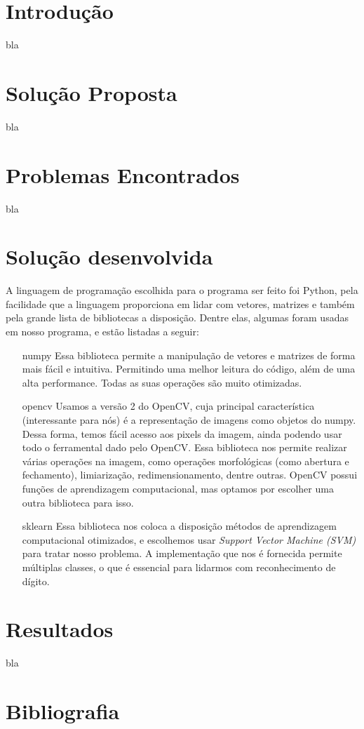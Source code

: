 \documentclass{lista}
\begin{document}
\cabecalho

\section{Introdução}
bla

\section{Solução Proposta}
bla

\section{Problemas Encontrados}
bla

\section{Solução desenvolvida}
A linguagem de programação escolhida para o programa ser feito foi Python,
pela facilidade que a linguagem proporciona em lidar com vetores, matrizes
e também pela grande lista de bibliotecas a disposição. Dentre elas,
algumas foram usadas em nosso programa, e estão listadas a seguir:

\begin{itemize}
	\item[numpy] Essa biblioteca permite a manipulação de vetores e matrizes
		de forma mais fácil e intuitiva. Permitindo uma melhor leitura do
		código, além de uma alta performance. Todas as suas operações são
		muito otimizadas.

	\item[opencv] Usamos a versão 2 do OpenCV, cuja principal característica
		(interessante para nós) é a representação de imagens como objetos
		do numpy. Dessa forma, temos fácil acesso aos pixels da imagem, ainda
		podendo usar todo o ferramental dado pelo OpenCV. Essa biblioteca nos
		permite realizar várias operações na imagem, como operações
		morfológicas (como abertura e fechamento), limiarização,
		redimensionamento, dentre outras. OpenCV possui funções de
		aprendizagem computacional, mas optamos por escolher uma outra
		biblioteca para isso.

	\item[sklearn] Essa biblioteca nos coloca a disposição métodos de
		aprendizagem computacional otimizados, e escolhemos usar 
		\textit{Support Vector Machine (SVM)} para tratar nosso problema.
		A implementação que nos é fornecida permite múltiplas classes, o que
		é essencial para lidarmos com reconhecimento de dígito.
\end{itemize}

\section{Resultados}
bla

\newpage
\section*{Bibliografia}
\end{document}
